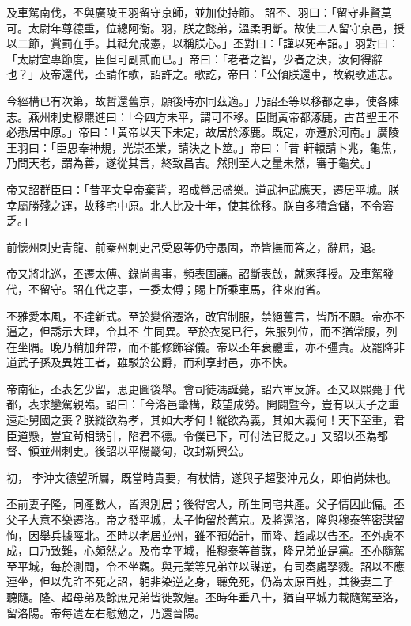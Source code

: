 \begin{pinyinscope}
 及車駕南伐，丕與廣陵王羽留守京師，並加使持節。
 詔丕、羽曰：「留守非賢莫可。太尉年尊德重，位總阿衡。羽，朕之懿弟，溫柔明斷。故使二人留守京邑，授以二節，賞罰在手。其祗允成憲，以稱朕心。」丕對曰：「謹以死奉詔。」羽對曰：「太尉宜專節度，臣但可副貳而已。」帝曰：「老者之智，少者之決，汝何得辭也？」及帝還代，丕請作歌，詔許之。歌訖，帝曰：「公傾朕還車，故親歌述志。



 今經構已有次第，故暫還舊京，願後時亦同茲適。」乃詔丕等以移都之事，使各陳志。燕州刺史穆羆進曰：「今四方未平，謂可不移。臣聞黃帝都涿鹿，古昔聖王不必悉居中原。」帝曰：「黃帝以天下未定，故居於涿鹿。既定，亦遷於河南。」廣陵王羽曰：「臣思奉神規，光崇丕業，請決之卜筮。」帝曰：「昔
 軒轅請卜兆，龜焦，乃問天老，謂為善，遂從其言，終致昌吉。然則至人之量未然，審于龜矣。」



 帝又詔群臣曰：「昔平文皇帝棄背，昭成營居盛樂。道武神武應天，遷居平城。朕幸屬勝殘之運，故移宅中原。北人比及十年，使其徐移。朕自多積倉儲，不令窘乏。」



 前懷州刺史青龍、前秦州刺史呂受恩等仍守愚固，帝皆撫而答之，辭屈，退。



 帝又將北巡，丕遷太傅、錄尚書事，頻表固讓。詔斷表啟，就家拜授。及車駕發代，丕留守。詔在代之事，一委太傅；賜上所乘車馬，往來府省。



 丕雅愛本風，不達新式。至於變俗遷洛，改官制服，禁絕舊言，皆所不願。帝亦不逼之，但誘示大理，令其不
 生同異。至於衣冕已行，朱服列位，而丕猶常服，列在坐隅。晚乃稍加弁帶，而不能修飾容儀。帝以丕年衰體重，亦不彊責。及罷降非道武子孫及異姓王者，雖駁於公爵，而利享封邑，亦不快。



 帝南征，丕表乞少留，思更圖後舉。會司徒馮誕薨，詔六軍反旆。丕又以熙薨于代都，表求鑾駕親臨。詔曰：「今洛邑肇構，跂望成勞。開闢暨今，豈有以天子之重遠赴舅國之喪？朕縱欲為孝，其如大孝何！縱欲為義，其如大義何！天下至重，君臣道懸，豈宜茍相誘引，陷君不德。令僕已下，可付法官貶之。」又詔以丕為都督、領並州刺史。後詔以平陽畿甸，改封新興公。



 初，
 李沖文德望所屬，既當時貴要，有杖情，遂與子超娶沖兄女，即伯尚妹也。



 丕前妻子隆，同產數人，皆與別居；後得宮人，所生同宅共產。父子情因此偏。丕父子大意不樂遷洛。帝之發平城，太子恂留於舊京。及將還洛，隆與穆泰等密謀留恂，因舉兵據陘北。丕時以老居並州，雖不預始計，而隆、超咸以告丕。丕外慮不成，口乃致難，心頗然之。及帝幸平城，推穆泰等首謀，隆兄弟並是黨。丕亦隨駕至平城，每於測問，令丕坐觀。與元業等兄弟並以謀逆，有司奏處孥戮。詔以丕應連坐，但以先許不死之詔，躬非染逆之身，聽免死，仍為太原百姓，其後妻二子
 聽隨。隆、超母弟及餘庶兄弟皆徙敦煌。丕時年垂八十，猶自平城力載隨駕至洛，留洛陽。帝每遣左右慰勉之，乃還晉陽。




\end{pinyinscope}
